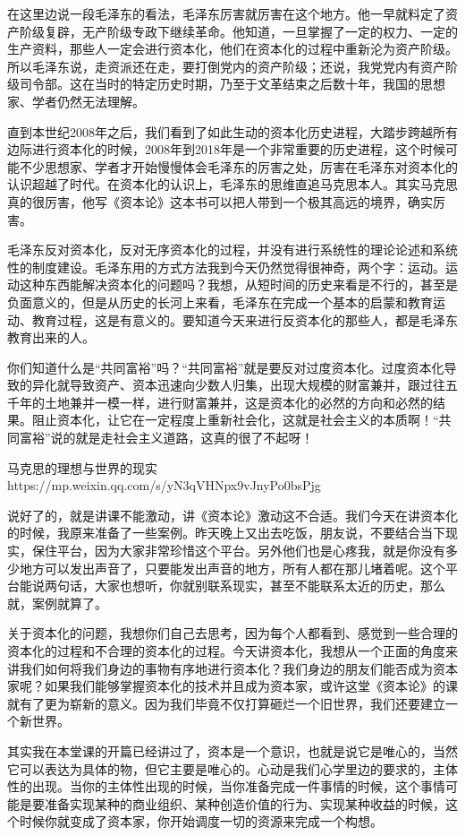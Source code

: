 \documentclass[UTF8, 12pt, a4paper]{ctexrep}
\begin{document}
在这里边说一段毛泽东的看法，毛泽东厉害就厉害在这个地方。他一早就料定了资产阶级复辟，无产阶级专政下继续革命。他知道，一旦掌握了一定的权力、一定的生产资料，那些人一定会进行资本化，他们在资本化的过程中重新沦为资产阶级。所以毛泽东说，走资派还在走，要打倒党内的资产阶级；还说，我党党内有资产阶级司令部。这在当时的特定历史时期，乃至于文革结束之后数十年，我国的思想家、学者仍然无法理解。

直到本世纪2008年之后，我们看到了如此生动的资本化历史进程，大踏步跨越所有边际进行资本化的时候，2008年到2018年是一个非常重要的历史进程，这个时候可能不少思想家、学者才开始慢慢体会毛泽东的厉害之处，厉害在毛泽东对资本化的认识超越了时代。在资本化的认识上，毛泽东的思维直追马克思本人。其实马克思真的很厉害，他写《资本论》这本书可以把人带到一个极其高远的境界，确实厉害。

毛泽东反对资本化，反对无序资本化的过程，并没有进行系统性的理论论述和系统性的制度建设。毛泽东用的方式方法我到今天仍然觉得很神奇，两个字：运动。运动这种东西能解决资本化的问题吗？我想，从短时间的历史来看是不行的，甚至是负面意义的，但是从历史的长河上来看，毛泽东在完成一个基本的启蒙和教育运动、教育过程，这是有意义的。要知道今天来进行反资本化的那些人，都是毛泽东教育出来的人。

你们知道什么是“共同富裕”吗？“共同富裕”就是要反对过度资本化。过度资本化导致的异化就导致资产、资本迅速向少数人归集，出现大规模的财富兼并，跟过往五千年的土地兼并一模一样，进行财富兼并，这是资本化的必然的方向和必然的结果。阻止资本化，让它在一定程度上重新社会化，这就是社会主义的本质啊！“共同富裕”说的就是走社会主义道路，这真的很了不起呀！

马克思的理想与世界的现实 https://mp.weixin.qq.com/s/yN3qVHNpx9vJnyPo0bsPjg

说好了的，就是讲课不能激动，讲《资本论》激动这不合适。我们今天在讲资本化的时候，我原来准备了一些案例。昨天晚上又出去吃饭，朋友说，不要结合当下现实，保住平台，因为大家非常珍惜这个平台。另外他们也是心疼我，就是你没有多少地方可以发出声音了，只要能发出声音的地方，所有人都在那儿堵着呢。这个平台能说两句话，大家也想听，你就别联系现实，甚至不能联系太近的历史，那么就，案例就算了。

关于资本化的问题，我想你们自己去思考，因为每个人都看到、感觉到一些合理的资本化的过程和不合理的资本化的过程。今天讲资本化，我想从一个正面的角度来讲我们如何将我们身边的事物有序地进行资本化？我们身边的朋友们能否成为资本家呢？如果我们能够掌握资本化的技术并且成为资本家，或许这堂《资本论》的课就有了更为崭新的意义。因为我们毕竟不仅打算砸烂一个旧世界，我们还要建立一个新世界。

其实我在本堂课的开篇已经讲过了，资本是一个意识，也就是说它是唯心的，当然它可以表达为具体的物，但它主要是唯心的。心动是我们心学里边的要求的，主体性的出现。当你的主体性出现的时候，当你准备完成一件事情的时候，这个事情可能是要准备实现某种的商业组织、某种创造价值的行为、实现某种收益的时候，这个时候你就变成了资本家，你开始调度一切的资源来完成一个构想。
\end{document}
